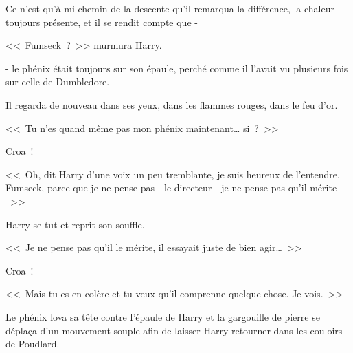 Ce n'est qu'à mi-chemin de la descente qu'il remarqua la différence, la chaleur toujours présente, et il se rendit compte que -

<<~Fumseck~?~>> murmura Harry.

- le phénix était toujours sur son épaule, perché comme il l'avait vu plusieurs fois sur celle de Dumbledore.

Il regarda de nouveau dans ses yeux, dans les flammes rouges, dans le feu d'or.

<<~Tu n'es quand même pas mon phénix maintenant… si~?~>>

Croa~!

<<~Oh, dit Harry d'une voix un peu tremblante, je suis heureux de l'entendre, Fumseck, parce que je ne pense pas - le directeur - je ne pense pas qu'il mérite -~>>

Harry se tut et reprit son souffle.

<<~Je ne pense pas qu'il le mérite, il essayait juste de bien agir…~>>

Croa~!

<<~Mais tu es en colère et tu veux qu'il comprenne quelque chose. Je vois.~>>

Le phénix lova sa tête contre l'épaule de Harry et la gargouille de pierre se déplaça d'un mouvement souple afin de laisser Harry retourner dans les couloirs de Poudlard.
